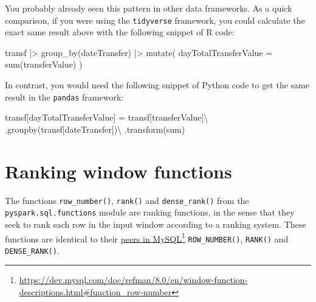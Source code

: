\documentclass[
  11pt,
  letterpaper,
  DIV=11,
  numbers=noendperiod]{scrreprt}
\newenvironment{Shaded}{\begin{snugshade}}{\end{snugshade}}
\newcommand{\AttributeTok}[1]{\textcolor[rgb]{0.40,0.45,0.13}{#1}}
\newcommand{\FunctionTok}[1]{\textcolor[rgb]{0.28,0.35,0.67}{#1}}
\newcommand{\NormalTok}[1]{\textcolor[rgb]{0.00,0.23,0.31}{#1}}
\newcommand{\OperatorTok}[1]{\textcolor[rgb]{0.37,0.37,0.37}{#1}}
\newcommand{\SpecialCharTok}[1]{\textcolor[rgb]{0.37,0.37,0.37}{#1}}
\newcommand{\StringTok}[1]{\textcolor[rgb]{0.13,0.47,0.30}{#1}}
\begin{document}
You probably already seen this pattern in other data frameworks. As a
quick comparison, if you were using the \texttt{tidyverse} framework,
you could calculate the exact same result above with the following
snippet of R code:

\begin{Shaded}
\begin{Highlighting}[]
\NormalTok{transf }\SpecialCharTok{|\textgreater{}}
    \FunctionTok{group\_by}\NormalTok{(dateTransfer) }\SpecialCharTok{|\textgreater{}}
    \FunctionTok{mutate}\NormalTok{(}
        \AttributeTok{dayTotalTransferValue =} \FunctionTok{sum}\NormalTok{(transferValue)}
\NormalTok{    )}
\end{Highlighting}
\end{Shaded}

In contrast, you would need the following snippet of Python code to get
the same result in the \texttt{pandas} framework:

\begin{Shaded}
\begin{Highlighting}[]
\NormalTok{transf[}\StringTok{\textquotesingle{}dayTotalTransferValue\textquotesingle{}}\NormalTok{] }\OperatorTok{=}\NormalTok{ transf[}\StringTok{\textquotesingle{}transferValue\textquotesingle{}}\NormalTok{]}\OperatorTok{\textbackslash{}}
\NormalTok{    .groupby(transf[}\StringTok{\textquotesingle{}dateTransfer\textquotesingle{}}\NormalTok{])}\OperatorTok{\textbackslash{}}
\NormalTok{    .transform(}\StringTok{\textquotesingle{}sum\textquotesingle{}}\NormalTok{)}
\end{Highlighting}
\end{Shaded}

\section{Ranking window functions}\label{ranking-window-functions}

The functions \texttt{row\_number()}, \texttt{rank()} and
\texttt{dense\_rank()} from the \texttt{pyspark.sql.functions} module
are ranking functions, in the sense that they seek to rank each row in
the input window according to a ranking system. These functions are
identical to their
\href{https://dev.mysql.com/doc/refman/8.0/en/window-function-descriptions.html\#function_row-number}{peers
in MySQL}\footnote{\url{https://dev.mysql.com/doc/refman/8.0/en/window-function-descriptions.html\#function_row-number}}
\texttt{ROW\_NUMBER()}, \texttt{RANK()} and \texttt{DENSE\_RANK()}.
\end{document}
